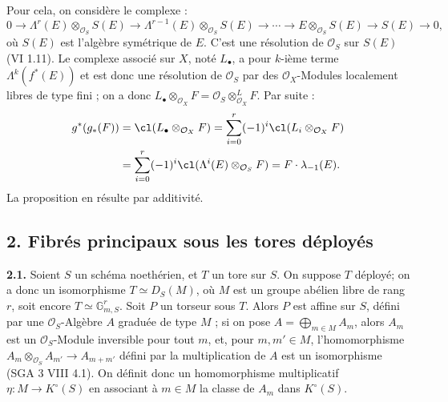 Pour cela, on considère le complexe :
\[
0\longrightarrow \Lambda^r(E)\otimes_{\mathcal O_S}S(E)\longrightarrow
\Lambda^{r-1}(E)\otimes_{\mathcal O_S}S(E)\longrightarrow\cdots\longrightarrow
E\otimes_{\mathcal O_S}S(E)\longrightarrow S(E)\longrightarrow 0,
\]
où $S(E)$ est l'algèbre symétrique de $E$. C'est une résolution de $\mathcal O_S$ sur $S(E)$ (VI 1.11). Le complexe associé sur $X$, noté $L_\bullet$, a pour $k$-ième terme $\Lambda^k(f^*(E))$ et est donc une résolution de $\mathcal O_S$ par des $\mathcal O_X$-Modules localement libres de type fini ; on a donc \(L_\bullet\otimes_{\mathcal O_X}F=\mathcal O_S\otimes^L_{\mathcal O_X}F\). Par suite :
\[
\begin{aligned}
g^*(g_*(F))
&=\cl(L_\bullet\otimes_{\mathcal O_X}F)
=\sum_{i=0}^r(-1)^i\cl(L_i\otimes_{\mathcal O_X}F)\\
&=\sum_{i=0}^r(-1)^i\cl(\Lambda^i(E)\otimes_{\mathcal O_S}F)
=F\cdot\lambda_{-1}(E).
\end{aligned}
\]
La proposition en résulte par additivité.

\subsection*{2. Fibrés principaux sous les tores déployés}

\textbf{2.1.} Soient $S$ un schéma noethérien, et $T$ un tore sur $S$. On suppose $T$ déployé; on a donc un isomorphisme $T\simeq D_S(M)$, où $M$ est un groupe abélien libre de rang $r$, soit encore $T\simeq \mathbb G_{m,S}^r$. Soit $P$ un torseur sous $T$. Alors $P$ est affine sur $S$, défini par une $\mathcal O_S$-Algèbre $A$ graduée de type $M$ ; si on pose $A=\bigoplus_{m\in M}A_m$, alors $A_m$ est un $\mathcal O_S$-Module inversible pour tout $m$, et, pour $m,m'\in M$, l'homomorphisme $A_m\otimes_{\mathcal O_S}A_{m'}\longrightarrow A_{m+m'}$ défini par la multiplication de $A$ est un isomorphisme (SGA 3 VIII 4.1). On définit donc un homomorphisme multiplicatif $\eta:M\longrightarrow K^\circ(S)$ en associant à $m\in M$ la classe de $A_m$ dans $K^\circ(S)$.


